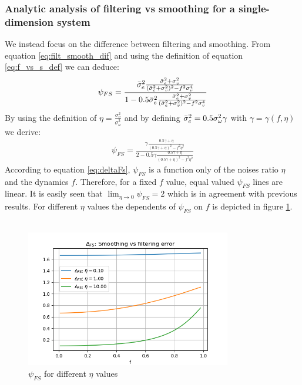 \documentclass[oneside,12pt]{article}
\begin{document}
\subsubsection{Analytic analysis of filtering vs smoothing for a single-dimension system}
We instead focus on the difference between filtering and smoothing. From equation \ref{eq:filt_smooth_dif} and using the definition of equation \ref{eq:f_vs_s_def} we can deduce:
%
\begin{equation}
    \begin{split}
        \psi_{FS} = \frac{\Bar{\sigma}_e^2 \frac{\Bar{\sigma}_e^2 + \sigma_v^2}{(\Bar{\sigma}_e^2 + \sigma_v^2)^2 - f^2 \sigma_v^4}}{1 - 0.5\Bar{\sigma}_e^2 \frac{\Bar{\sigma}_e^2 + \sigma_v^2}{(\Bar{\sigma}_e^2 + \sigma_v^2)^2 - f^2 \sigma_v^4}}\\
    \end{split}
\end{equation}
%
By using the definition of $\eta = \frac{\sigma_v^2}{\sigma_\omega^2}$ and by defining $\Bar{\sigma}_e^2 = 0.5 \sigma_\omega^2\gamma$ with $\gamma = \gamma(f,\eta)$ we derive:
%
\begin{equation}\label{eq:deltaFs}
    \begin{split}
        \psi_{FS} = \frac{\gamma \frac{0.5\gamma + \eta}{(0.5\gamma + \eta)^2 - f^2 \eta^2}}{2 - 0.5\gamma \frac{0.5\gamma + \eta}{(0.5\gamma + \eta)^2 - f^2 \eta^2}} 
    \end{split}
\end{equation}
According to equation \ref{eq:deltaFs}, $\psi_{FS}$ is a function only of the noises ratio $\eta$ and the dynamics $f$. Therefore, for a fixed $f$ value, equal valued $\psi_{FS}$ lines are linear. It is easily seen that $\operatorname{lim}_{\eta \xrightarrow{} 0}\psi_{FS} = 2$ which is in agreement with previous results. For different $\eta$ values the dependents of $\psi_{FS}$ on $f$ is depicted in figure \ref{fig:deltaFS_vs_f}.\\\\
%
\begin{figure}
    \centering
        \includegraphics[width=0.8\textwidth]{./deltaFS_vs_f}
        \caption{\label{fig:deltaFS_vs_f}$\psi_{FS}$ for different $\eta$ values}
\end{figure}
\end{document}
